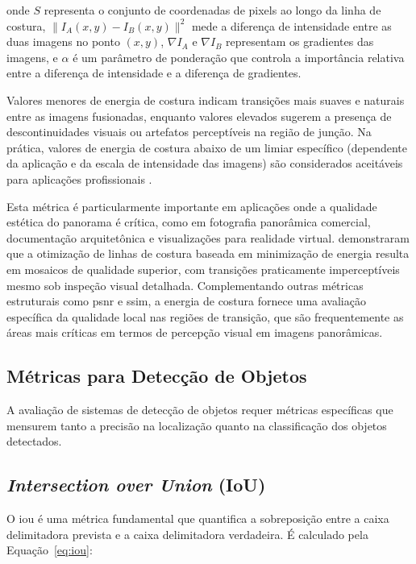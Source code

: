 \noindent onde $S$ representa o conjunto de coordenadas de pixels ao longo da linha de costura, $\|I_A(x,y) - I_B(x,y)\|^2$ mede a diferença de intensidade entre as duas imagens no ponto $(x,y)$, $\nabla I_A$ e $\nabla I_B$ representam os gradientes das imagens, e $\alpha$ é um parâmetro de ponderação que controla a importância relativa entre a diferença de intensidade e a diferença de gradientes.

Valores menores de energia de costura indicam transições mais suaves e naturais entre as imagens fusionadas, enquanto valores elevados sugerem a presença de descontinuidades visuais ou artefatos perceptíveis na região de junção. Na prática, valores de energia de costura abaixo de um limiar específico (dependente da aplicação e da escala de intensidade das imagens) são considerados aceitáveis para aplicações profissionais \cite{BrownLowe2007}.

Esta métrica é particularmente importante em aplicações onde a qualidade estética do panorama é crítica, como em fotografia panorâmica comercial, documentação arquitetônica e visualizações para realidade virtual.  demonstraram que a otimização de linhas de costura baseada em minimização de energia resulta em mosaicos de qualidade superior, com transições praticamente imperceptíveis mesmo sob inspeção visual detalhada. Complementando outras métricas estruturais como \gls{psnr} e \gls{ssim}, a energia de costura fornece uma avaliação específica da qualidade local nas regiões de transição, que são frequentemente as áreas mais críticas em termos de percepção visual em imagens panorâmicas.

\subsection{Métricas para Detecção de Objetos}

A avaliação de sistemas de detecção de objetos requer métricas específicas que mensurem tanto a precisão na localização quanto na classificação dos objetos detectados.

\subsection*{\textit{Intersection over Union} (IoU)}

O \gls{iou} é uma métrica fundamental que quantifica a sobreposição entre a caixa delimitadora prevista e a caixa delimitadora verdadeira. É calculado pela Equação~\ref{eq:iou}:

